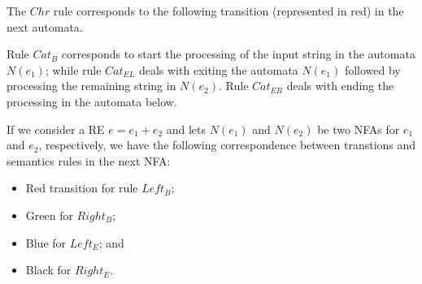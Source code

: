 \documentclass[sigplan]{acmart}
\theoremstyle{definition}
\begin{document}
The $Chr$ rule corresponds to the following transition (represented in red) in the next automata.

\begin{center}
\end{center}

Rule $Cat_B$ corresponds to start the processing of the input string in the automata $N(e_1)$;
while rule $Cat_{EL}$ deals with exiting the automata  $N(e_1)$ followed by processing the remaining
string in $N(e_2)$. Rule $Cat_{ER}$ deals with ending the processing in the automata below.

\begin{center}
\end{center}

If we consider a RE $e = e_1 + e_2$ and lets $N(e_1)$ and $N(e_2)$ be two NFAs for
$e_1$ and $e_2$, respectively, we have the following correspondence between transtions and
semantics rules in the next NFA:

\begin{itemize}
\item Red transition for rule $Left_B$;
\item Green for $Right_B$;
\item Blue for $Left_E$; and
\item Black for $Right_E$.
\end{itemize}
\end{document}
